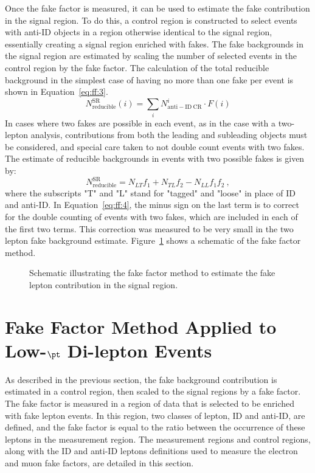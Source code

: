 Once the fake factor is measured, it can be used to estimate the fake contribution in the signal region.  To do this, a control region is constructed to select events with anti-ID objects in a region otherwise identical to the signal region, essentially creating a signal region enriched with fakes.  The fake backgrounds in the signal region are estimated by scaling the number of selected events in the control region by the fake factor.  The calculation of the total reducible background in the simplest case of having no more than one fake per event is shown in Equation~\ref{eq:ff:3}.
\begin{equation}
N^{\mathrm{SR}}_{\mathrm{reducible}}(i)=\sum_{i}{N^i_{\mathrm{anti-ID~CR}}\cdot F(i)}
\label{eq:ff:3}
\end{equation}
In cases where two fakes are possible in each event, as in the case with a two-lepton analysis, contributions from both the leading and subleading objects must be considered, and special care taken to not double count events with two fakes.  The estimate of reducible backgrounds in events with two possible fakes is given by:
\begin{equation}
N^{\mathrm{SR}}_{\mathrm{reducible}}=N_{LT}f_1+N_{TL}f_2-N_{LL}f_1f_2~,
\label{eq:ff:4}
\end{equation}
where the subscripts "T" and "L" stand for "tagged" and "loose" in place of ID and anti-ID.  In Equation~\ref{eq:ff:4}, the minus sign on the last term is to correct for the double counting of events with two fakes, which are included in each of the first two terms.  This correction was measured to be very small in the two lepton fake background estimate.  Figure~\ref{fig:fake_schematic} shows a schematic of the fake factor method.
   
\begin{figure}
\centering
 
 \caption{Schematic illustrating the fake factor method to estimate the fake lepton contribution in the signal region.}
 \label{fig:fake_schematic}
 \end{figure}
 

  \FloatBarrier
  
  \section{Fake Factor Method Applied to Low-$\pt$ Di-lepton Events}
  \label{sec:FFmethod}
As described in the previous section, the fake background contribution is estimated in a control region, then scaled to the signal regions by a fake factor.  The fake factor is measured in a region of data that is selected to be enriched with fake lepton events.  In this region, two classes of lepton, ID and anti-ID, are defined, and the fake factor is equal to the ratio between the occurrence of these leptons in the measurement region.  The measurement regions and control regions, along with the ID and anti-ID leptons definitions used to measure the electron and muon fake factors, are detailed in this section.  

